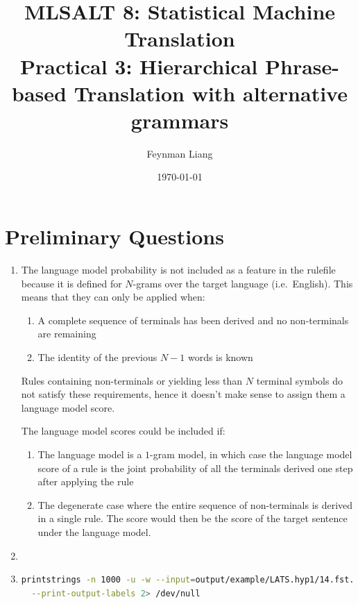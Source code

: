 \documentclass[a4paper,oneside,reqno]{amsart}
\newcommand{\authorname}{Feynman Liang}
\newcommand{\coursename}{MLSALT 8: Statistical Machine Translation}
\newcommand{\assignmentname}{Practical 3: Hierarchical Phrase-based Translation
with alternative grammars}
\begin{document}
\title{\coursename\\\assignmentname}

\author{\authorname}
\date{\today}

\maketitle

\section{Preliminary Questions}
\begin{enumerate}[label=\arabic*.]
  \item The language model probability is not included as a feature in the
    rulefile because it is defined for $N$-grams over the target language
    (i.e.\ English). This means that they can only be applied when:
    \begin{enumerate}
      \item A complete sequence of terminals has been derived and no
        non-terminals are remaining
      \item The identity of the previous $N-1$ words is known
    \end{enumerate}
    Rules containing non-terminals or yielding less than $N$ terminal symbols
    do not satisfy these requirements, hence it doesn't make sense to assign
    them a language model score.

    The language model scores could be included if:
    \begin{enumerate}
      \item The language model is a $1$-gram model, in which case the language
        model score of a rule is the joint probability of all the terminals
        derived one step after applying the rule
      \item The degenerate case where the entire sequence of non-terminals is
        derived in a single rule. The score would then be the score of the
        target sentence under the language model.
    \end{enumerate}

  \item %

  \item %
    \begin{lstlisting}[language=bash]
printstrings -n 1000 -u -w --input=output/example/LATS.hyp1/14.fst.gz \
  --print-output-labels 2> /dev/null
    \end{lstlisting}


\end{enumerate}
\end{document}
